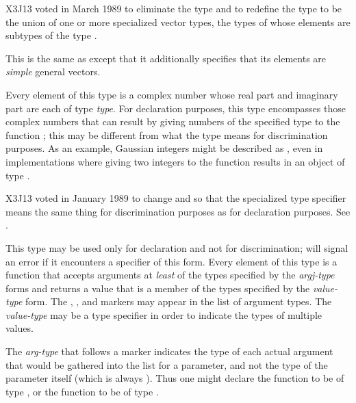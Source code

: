\begin{flushdesc}
\begin{newer}
X3J13 voted in March 1989 
to eliminate the type  and to redefine the type
 to be the union of one or more specialized vector
types, the types of whose elements are subtypes of the type .
\end{newer}

\item[\cd{(simple-vector \emph{size})}]
This is the same
as  except that it additionally specifies
that its elements are \emph{simple} general vectors.

\item[\cd{(complex \emph{type})}]
Every element of this type is a
complex number whose real part
and imaginary part are each of type \emph{type}.
For declaration purposes, this type encompasses those complex numbers
that can result by giving numbers of the specified type
to the function ; this may be different
from what the type means for discrimination purposes.
As an example, Gaussian integers might be
described as , even in implementations
where giving two integers to the function  results
in an object of type .

\begin{new}
X3J13 voted in January 1989
to change  and 
so that the specialized 
type specifier means the same thing for discrimination purposes
as for declaration purposes.
See .
\end{new}


\item[\cd{(function (\emph{arg1-type} \emph{arg2-type} ...) \emph{value-type})}]
\relax This type may be used only for declaration and not for
discrimination;  will signal an error if it encounters a specifier of
this form. Every element of this type is
a function that accepts arguments at \emph{least} of the
types specified by the \emph{argj-type} forms and returns a value that is a
member of the types specified by the \emph{value-type} form.  The
, , and  markers
may appear in the list of argument types.
The \emph{value-type} may be a  type specifier
in order to indicate the types of multiple values.

The \emph{arg-type} that
follows a  marker indicates the type of each actual argument
that would be gathered into the list for a  parameter,
and not the type of the  parameter itself (which is always
).  Thus one might declare the function  to
be of type , or
the function  to be of type
.


\end{flushdesc}
